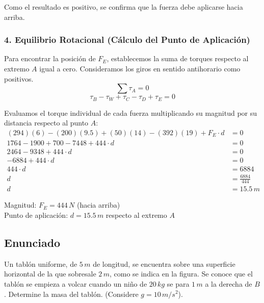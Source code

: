 \documentclass[12pt, a4paper]{article}
\begin{document}
Como el resultado es positivo, se confirma que la fuerza debe aplicarse hacia arriba.

\subsubsection*{4. Equilibrio Rotacional (Cálculo del Punto de Aplicación)}
Para encontrar la posición de $F_E$, establecemos la suma de torques respecto al extremo $A$ igual a cero. Consideramos los giros en sentido antihorario como positivos.
$$\sum \tau_A = 0$$
$$\tau_B - \tau_W + \tau_C - \tau_D + \tau_E = 0$$

Evaluamos el torque individual de cada fuerza multiplicando su magnitud por su distancia respecto al punto $A$:
\begin{align*}
    (294)(6) - (200)(9.5) + (50)(14) - (392)(19) + F_E \cdot d &= 0 \\
    1764 - 1900 + 700 - 7448 + 444 \cdot d &= 0 \\
    2464 - 9348 + 444 \cdot d &= 0 \\
    -6884 + 444 \cdot d &= 0 \\
    444 \cdot d &= 6884 \\
    d &= \frac{6884}{444} \\
    d &= 15.5 \, \si{m}
\end{align*}

\begin{tcolorbox}[colback=green!5!white, colframe=green!50!black, title=Respuesta Final]
\centering 
Magnitud: $F_E = 444 \, \si{N}$ (hacia arriba) \\
Punto de aplicación: $d = 15.5 \, \si{m}$ respecto al extremo $A$
\end{tcolorbox}

\newpage

\subsection*{Enunciado}
Un tablón uniforme, de $5 \, \si{m}$ de longitud, se encuentra sobre una superficie horizontal de la que sobresale $2 \, \si{m}$, como se indica en la figura. Se conoce que el tablón se empieza a volcar cuando un niño de $20 \, \si{kg}$ se para $1 \, \si{m}$ a la derecha de $B$. Determine la masa del tablón. (Considere $g=10\,\si{m/s^2}$).

\begin{center}
\end{center}
\end{document}

